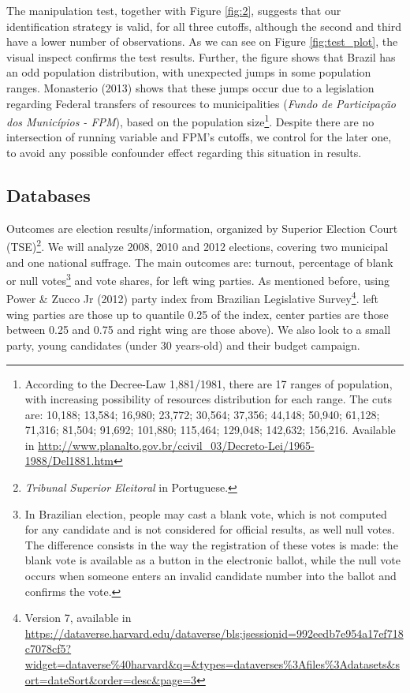 \documentclass[
  12pt,
]{article}
\begin{document}
The manipulation test, together with Figure \ref{fig:2}, suggests that
our identification strategy is valid, for all three cutoffs, although
the second and third have a lower number of observations. As we can see
on Figure \ref{fig:test_plot}, the visual inspect confirms the test
results. Further, the figure shows that Brazil has an odd population
distribution, with unexpected jumps in some population ranges.
Monasterio (2013) shows that these jumps occur due to a legislation
regarding Federal transfers of resources to municipalities (\emph{Fundo
de Participação dos Municípios - FPM}), based on the population
size\footnote{According to the Decree-Law 1,881/1981, there are 17
  ranges of population, with increasing possibility of resources
  distribution for each range. The cuts are: 10,188; 13,584; 16,980;
  23,772; 30,564; 37,356; 44,148; 50,940; 61,128; 71,316; 81,504;
  91,692; 101,880; 115,464; 129,048; 142,632; 156,216. Available in
  \url{http://www.planalto.gov.br/ccivil_03/Decreto-Lei/1965-1988/Del1881.htm}}.
Despite there are no intersection of running variable and FPM's cutoffs,
we control for the later one, to avoid any possible confounder effect
regarding this situation in results.

\hypertarget{databases}{%
\subsection{Databases}\label{databases}}

Outcomes are election results/information, organized by Superior
Election Court (TSE)\footnote{\emph{Tribunal Superior Eleitoral} in
  Portuguese.}. We will analyze 2008, 2010 and 2012 elections, covering
two municipal and one national suffrage. The main outcomes are: turnout,
percentage of blank or null votes\footnote{In Brazilian election, people
  may cast a blank vote, which is not computed for any candidate and is
  not considered for official results, as well null votes. The
  difference consists in the way the registration of these votes is
  made: the blank vote is available as a button in the electronic
  ballot, while the null vote occurs when someone enters an invalid
  candidate number into the ballot and confirms the vote.} and vote
shares, for left wing parties. As mentioned before, using Power \& Zucco
Jr (2012) party index from Brazilian Legislative Survey\footnote{Version
  7, available in
  \url{https://dataverse.harvard.edu/dataverse/bls;jsessionid=992eedb7e954a17ef718c7078cf5?widget=dataverse\%40harvard\&q=\&types=dataverses\%3Afiles\%3Adatasets\&sort=dateSort\&order=desc\&page=3}}.
left wing parties are those up to quantile 0.25 of the index, center
parties are those between 0.25 and 0.75 and right wing are those above).
We also look to a small party, young candidates (under 30 years-old) and
their budget campaign.
\end{document}
